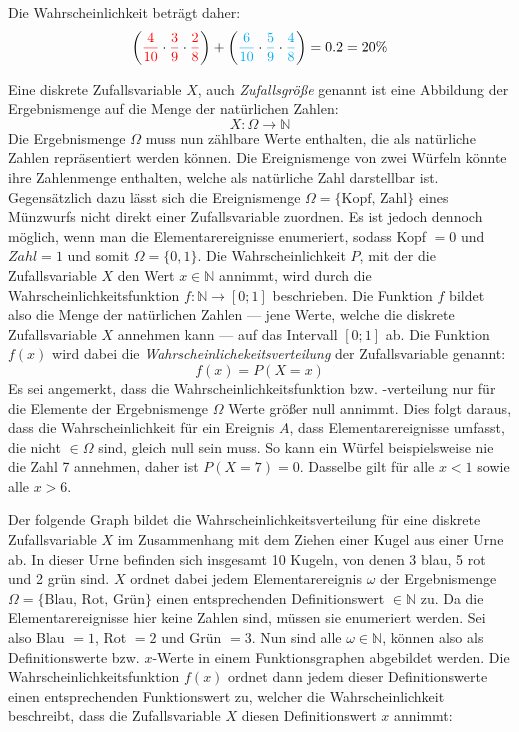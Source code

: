 \vspace{\parskip}

Die Wahrscheinlichkeit betr\"{a}gt daher: $$\left({\color{red} \frac{4}{10}} \cdot {\color{red} \frac{3}{9}} \cdot {\color{red} \frac{2}{8}}\right) + \left({\color{cyan} \frac{6}{10}} \cdot {\color{cyan}\frac{5}{9}} \cdot {\color{cyan}\frac{4}{8}}\right) = 0.2 = 20 \%$$


Eine diskrete Zufallsvariable $X$, auch \emph{Zufallsgr\"{o}\ss{}e} genannt ist eine Abbildung der Ergebnismenge auf die Menge der nat\"{u}rlichen Zahlen: $$X: \Omega \rightarrow \mathbb{N}$$ Die Ergebnismenge $\Omega$ muss nun z\"{a}hlbare Werte enthalten, die als nat\"{u}rliche Zahlen repr\"{a}sentiert werden k\"{o}nnen. Die Ereignismenge von zwei W\"{u}rfeln k\"{o}nnte ihre Zahlenmenge enthalten, welche als nat\"{u}rliche Zahl darstellbar ist. Gegens\"{a}tzlich dazu l\"{a}sst sich die Ereignismenge $\Omega = \{ \text{Kopf, Zahl} \}$ eines M\"{u}nzwurfs nicht direkt einer Zufallsvariable zuordnen. Es ist jedoch dennoch m\"{o}glich, wenn man die Elementarereignisse enumeriert, sodass Kopf $= 0$ und $Zahl = 1$ und somit $\Omega = \{0 , 1\}$. Die Wahrscheinlichkeit $P$, mit der die Zufallsvariable $X$ den Wert $x \in \mathbb{N}$ annimmt, wird durch die Wahrscheinlichkeitsfunktion $f: \mathbb{N} \rightarrow [0 ; 1]$ beschrieben. Die Funktion $f$ bildet also die Menge der nat\"{u}rlichen Zahlen --- jene Werte, welche die diskrete Zufallsvariable $X$ annehmen kann --- auf das Intervall $[0 ; 1]$ ab. Die Funktion $f(x)$ wird dabei die \emph{Wahrscheinlichekeitsverteilung} der Zufallsvariable genannt: $$f(x) = P(X = x)$$ Es sei angemerkt, dass die Wahrscheinlichkeitsfunktion bzw. -verteilung nur f\"{u}r die Elemente der Ergebnismenge $\Omega$ Werte gr\"{o}\ss{}er null annimmt. Dies folgt daraus, dass die Wahrscheinlichkeit f\"{u}r ein Ereignis $A$, dass Elementarereignisse umfasst, die nicht $\in \Omega$ sind, gleich null sein muss. So kann ein W\"{u}rfel beispielsweise nie die Zahl 7 annehmen, daher ist $P(X = 7) = 0$. Dasselbe gilt f\"{u}r alle $x < 1$ sowie alle $x > 6$.

\pagebreak

Der folgende Graph bildet die Wahrscheinlichkeitsverteilung f\"{u}r eine diskrete Zufallsvariable $X$ im Zusammenhang mit dem Ziehen einer Kugel aus einer Urne ab. In dieser Urne befinden sich insgesamt 10 Kugeln, von denen 3 blau, 5 rot und 2 gr\"{u}n sind. $X$ ordnet dabei jedem Elementarereignis $\omega$ der Ergebnismenge $\Omega = \{\text{Blau, Rot, Gr\"{u}n}\}$ einen entsprechenden Definitionswert $\in \mathbb{N}$ zu. Da die Elementarereignisse hier keine Zahlen sind, m\"{u}ssen sie enumeriert werden. Sei also Blau $= 1$, Rot $= 2$ und Gr\"{u}n $= 3$. Nun sind alle $\omega \in \mathbb{N}$, k\"{o}nnen also als Definitionswerte bzw. $x$-Werte in einem Funktionsgraphen abgebildet werden. Die Wahrscheinlichkeitsfunktion $f(x)$ ordnet dann jedem dieser Definitionswerte einen entsprechenden Funktionswert zu, welcher die Wahrscheinlichkeit beschreibt, dass die Zufallsvariable $X$ diesen Definitionswert $x$ annimmt:

